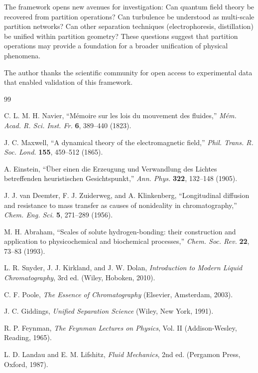 \documentclass[twocolumn,superscriptaddress,prb,10pt]{revtex4-2}
\begin{document}
The framework opens new avenues for investigation: Can quantum field theory be recovered from partition operations? Can turbulence be understood as multi-scale partition networks? Can other separation techniques (electrophoresis, distillation) be unified within partition geometry? These questions suggest that partition operations may provide a foundation for a broader unification of physical phenomena.


\begin{acknowledgments}
The author thanks the scientific community for open access to experimental data that enabled validation of this framework.
\end{acknowledgments}


\begin{thebibliography}{99}

C. L. M. H. Navier,
``M\'emoire sur les lois du mouvement des fluides,''
\textit{M\'em. Acad. R. Sci. Inst. Fr.} \textbf{6}, 389--440 (1823).

J. C. Maxwell,
``A dynamical theory of the electromagnetic field,''
\textit{Phil. Trans. R. Soc. Lond.} \textbf{155}, 459--512 (1865).

A. Einstein,
``Über einen die Erzeugung und Verwandlung des Lichtes betreffenden heuristischen Gesichtspunkt,''
\textit{Ann. Phys.} \textbf{322}, 132--148 (1905).

J. J. van Deemter, F. J. Zuiderweg, and A. Klinkenberg,
``Longitudinal diffusion and resistance to mass transfer as causes of nonideality in chromatography,''
\textit{Chem. Eng. Sci.} \textbf{5}, 271--289 (1956).

M. H. Abraham,
``Scales of solute hydrogen-bonding: their construction and application to physicochemical and biochemical processes,''
\textit{Chem. Soc. Rev.} \textbf{22}, 73--83 (1993).

L. R. Snyder, J. J. Kirkland, and J. W. Dolan,
\textit{Introduction to Modern Liquid Chromatography}, 3rd ed.
(Wiley, Hoboken, 2010).

C. F. Poole,
\textit{The Essence of Chromatography}
(Elsevier, Amsterdam, 2003).

J. C. Giddings,
\textit{Unified Separation Science}
(Wiley, New York, 1991).

R. P. Feynman,
\textit{The Feynman Lectures on Physics}, Vol. II
(Addison-Wesley, Reading, 1965).

L. D. Landau and E. M. Lifshitz,
\textit{Fluid Mechanics}, 2nd ed.
(Pergamon Press, Oxford, 1987).

\end{thebibliography}
\end{document}
